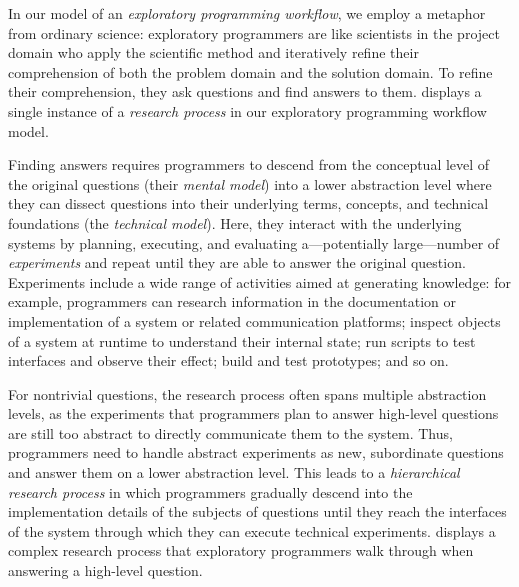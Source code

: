 In our model of an \emph{exploratory programming workflow}, we employ a metaphor from ordinary science:
exploratory programmers are like scientists in the project domain who apply the scientific method and iteratively refine their comprehension of both the problem domain and the solution domain.
To refine their comprehension, they ask questions and find answers to them.
 displays a single instance of a \emph{research process} in our exploratory programming workflow model.

Finding answers requires programmers to descend from the conceptual level of the original questions (their \emph{mental model}) into a lower abstraction level where they can dissect questions into their underlying terms, concepts, and technical foundations (the \emph{technical model}).
Here, they interact with the underlying systems by planning, executing, and evaluating a---potentially large---number of \emph{experiments} and repeat until they are able to answer the original question.
Experiments include a wide range of activities aimed at generating knowledge:
for example, programmers can research information in the documentation or implementation of a system or related communication platforms; inspect objects of a system at runtime to understand their internal state; run scripts to test interfaces and observe their effect; build and test prototypes; and so on.

For nontrivial questions, the research process often spans multiple abstraction levels, as the experiments that programmers plan to answer high-level questions are still too abstract to directly communicate them to the system.
Thus, programmers need to handle abstract experiments as new, subordinate questions and answer them on a lower abstraction level.
This leads to a \emph{hierarchical research process} in which programmers gradually descend into the implementation details of the subjects of questions until they reach the interfaces of the system through which they can execute technical experiments.
 displays a complex research process that exploratory programmers walk through when answering a high-level question.

